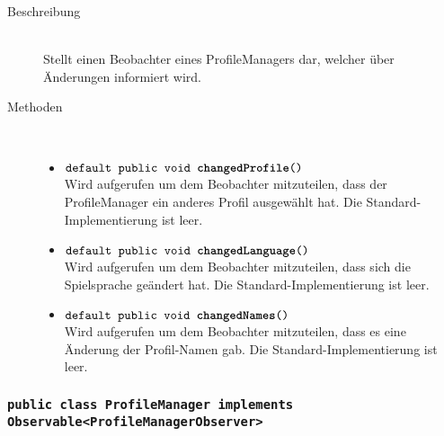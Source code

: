 \begin{description}
\item[Beschreibung] \hfill \\ Stellt einen Beobachter eines ProfileManagers dar, welcher über Änderungen informiert wird.

\item[Methoden] \hfill \\
	\vspace{-.8cm}
	\begin{itemize}
		\item $\texttt{default public void \textbf{changedProfile}()}$ \\ Wird aufgerufen um dem Beobachter mitzuteilen, 
		dass der ProfileManager ein anderes Profil ausgewählt hat. Die Standard-Implementierung ist leer.
		\item $\texttt{default public void \textbf{changedLanguage}()}$ \\ Wird aufgerufen um dem Beobachter mitzuteilen, 
		dass sich die Spielsprache geändert hat. Die Standard-Implementierung ist leer.
		\item $\texttt{default public void \textbf{changedNames}()}$ \\ Wird aufgerufen um dem Beobachter mitzuteilen, 
		dass es eine Änderung der Profil-Namen gab. Die Standard-Implementierung ist leer.
	\end{itemize}
\end{description}

\subsubsection{\normalfont \texttt{public class \textbf{ProfileManager} implements Observable<ProfileManagerObserver>}}

